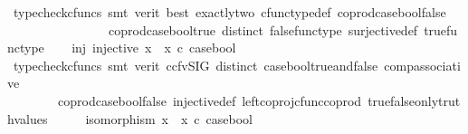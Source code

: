\begin{isabellebody}
\ {\isacharparenleft}{\kern0pt}typecheck{\isacharunderscore}{\kern0pt}cfuncs{\isacharcomma}{\kern0pt}\ smt\ {\isacharparenleft}{\kern0pt}verit{\isacharcomma}{\kern0pt}\ best{\isacharparenright}{\kern0pt}\ exactly{\isacharunderscore}{\kern0pt}two\ cfunc{\isacharunderscore}{\kern0pt}type{\isacharunderscore}{\kern0pt}def\ coprod{\isacharunderscore}{\kern0pt}case{\isacharunderscore}{\kern0pt}bool{\isacharunderscore}{\kern0pt}false\isanewline
\ \ \ \ \ \ \ \ \ \ \ \ \ \ \ \ coprod{\isacharunderscore}{\kern0pt}case{\isacharunderscore}{\kern0pt}bool{\isacharunderscore}{\kern0pt}true\ distinct\ false{\isacharunderscore}{\kern0pt}func{\isacharunderscore}{\kern0pt}type\ surjective{\isacharunderscore}{\kern0pt}def\ true{\isacharunderscore}{\kern0pt}func{\isacharunderscore}{\kern0pt}type{\isacharparenright}{\kern0pt}\isanewline
\ \ \isamarkupfalse%
\ inj{\isacharcolon}{\kern0pt}\ {\isachardoublequoteopen}injective\ {\isacharparenleft}{\kern0pt}{\isacharparenleft}{\kern0pt}x{}\ {\isasymamalg}\ x{}{\isacharparenright}{\kern0pt}\ {\isasymcirc}\isactrlsub c\ case{\isacharunderscore}{\kern0pt}bool{\isacharparenright}{\kern0pt}{\isachardoublequoteclose}\isanewline
\ \ \ \ \isamarkupfalse%
\ {\isacharparenleft}{\kern0pt}typecheck{\isacharunderscore}{\kern0pt}cfuncs{\isacharcomma}{\kern0pt}\ smt\ {\isacharparenleft}{\kern0pt}verit{\isacharcomma}{\kern0pt}\ ccfv{\isacharunderscore}{\kern0pt}SIG{\isacharparenright}{\kern0pt}\ distinct\ case{\isacharunderscore}{\kern0pt}bool{\isacharunderscore}{\kern0pt}true{\isacharunderscore}{\kern0pt}and{\isacharunderscore}{\kern0pt}false\ comp{\isacharunderscore}{\kern0pt}associative{}\ \isanewline
\ \ \ \ \ \ \ \ coprod{\isacharunderscore}{\kern0pt}case{\isacharunderscore}{\kern0pt}bool{\isacharunderscore}{\kern0pt}false\ injective{\isacharunderscore}{\kern0pt}def{}\ left{\isacharunderscore}{\kern0pt}coproj{\isacharunderscore}{\kern0pt}cfunc{\isacharunderscore}{\kern0pt}coprod\ true{\isacharunderscore}{\kern0pt}false{\isacharunderscore}{\kern0pt}only{\isacharunderscore}{\kern0pt}truth{\isacharunderscore}{\kern0pt}values{\isacharparenright}{\kern0pt}\isanewline
\ \ \isamarkupfalse%
\ \isamarkupfalse%
\ {\isachardoublequoteopen}isomorphism\ {\isacharparenleft}{\kern0pt}{\isacharparenleft}{\kern0pt}x{}\ {\isasymamalg}\ x{}{\isacharparenright}{\kern0pt}\ {\isasymcirc}\isactrlsub c\ case{\isacharunderscore}{\kern0pt}bool{\isacharparenright}{\kern0pt}{\isachardoublequoteclose}\isanewline
\ \ \ \ \isamarkupfalse%

\end{isabellebody}
